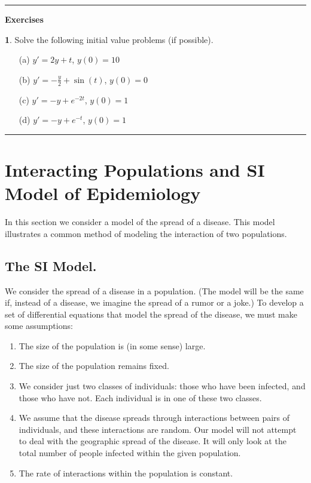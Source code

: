 \documentclass[reqno]{immbook}
\newcommand{\ds}{\displaystyle}
\numberwithin{equation}{chapter}
\numberwithin{question}{section}
\numberwithin{theorem}{chapter}
\numberwithin{figure}{chapter}
\theoremstyle{definition}
\newtheorem{exercise}{}[section]
\newenvironment{exercises}%
{%
\medskip\hrule\medskip\noindent\textbf{Exercises}%
}%
{%
\medskip\hrule
}
\begin{document}
\begin{exercises}
\begin{exercise}
Solve the following initial value problems (if possible).
\begin{enumerate}
\item[(a)] $\ds y' = 2y+t$, \hspace{0.25cm} $y(0)=10$
\item[(b)] $\ds y' = -\frac{y}{2} + \sin(t)$, \hspace{0.25cm} $y(0)=0$
\item[(c)] $\ds y' = -y + e^{-2t}$, \hspace{0.25cm} $y(0)=1$
\item[(d)] $\ds y' = -y + e^{-t}$, \hspace{0.25cm} $y(0)=1$
\end{enumerate}
\end{exercise}
\end{exercises}


\newpage

\section{Interacting Populations and SI Model of Epidemiology}

In this section we consider a model of the spread of a disease.
This model illustrates a common method of
modeling the interaction of two populations.



\subsection*{The SI Model.}
We consider the spread of a
disease in a population.
(The model will be the same if, instead of a disease,
we imagine the spread of a rumor or a joke.)
To develop a set of differential equations that model
the spread of the disease, we must make some assumptions:
\begin{enumerate}
\item
\label{SI_assume_large_N}
The size of the population is (in some sense)
large.
\item
\label{SI_assume_constant_N}
The size of the population remains fixed.
\item
\label{SI_assume_two_classes}
We  consider just two classes
of individuals: those who have been infected, and those who have
not.  Each individual is in one of these two classes.
\item
We assume that the disease spreads through
interactions between pairs of individuals, and
these interactions are random.
Our model will not attempt to deal with the geographic spread
of the disease. It will only look at the total number of
people infected within the given population.
\item
The rate of interactions within the population is constant.
\end{enumerate}
\end{document}
